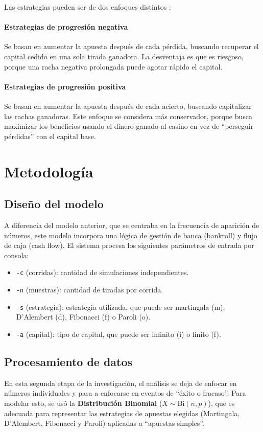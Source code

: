 \documentclass{article}
\begin{document}
Las estrategias pueden ser de dos enfoques distintos \cite{estrategias_progresion}:

\paragraph{Estrategias de progresión negativa} Se basan en aumentar la apuesta después de cada pérdida, buscando recuperar el capital cedido en una sola tirada ganadora. La desventaja es que es riesgoso, porque una racha negativa prolongada puede agotar rápido el capital.

\paragraph{Estrategias de progresión positiva} Se basan en aumentar la apuesta después de cada acierto, buscando capitalizar las rachas ganadoras. Este enfoque se considera más conservador, porque busca maximizar los beneficios usando el dinero ganado al casino en vez de “perseguir pérdidas” con el capital base.




\section{Metodología}
\label{sec:metodologia}

\subsection{Diseño del modelo}
A diferencia del modelo anterior, que se centraba en la frecuencia de aparición de números, este modelo incorpora una lógica de gestión de banca (bankroll) y flujo de caja (cash flow). El sistema procesa los siguientes parámetros de entrada por consola:

\begin{itemize}
  \item \texttt{-c} (corridas): cantidad de simulaciones independientes.
  \item \texttt{-n} (muestras): cantidad de tiradas por corrida.
  \item \texttt{-s} (estrategia): estrategia utilizada, que puede ser martingala (m), D’Alembert (d), Fibonacci (f) o Paroli (o).
  \item \texttt{-a} (capital): tipo de capital, que puede ser infinito (i) o finito (f).
\end{itemize}

\subsection{Procesamiento de datos}
En esta segunda etapa de la investigación, el análisis se deja de enfocar en números individuales y pasa a enfocarse en eventos de “éxito o fracaso”. Para modelar esto, se usó la \textbf{Distribución Binomial} ($X\sim \mathrm{Bi}(n,p)$), que es adecuada para representar las estrategias de apuestas elegidas (Martingala, D’Alembert, Fibonacci y Paroli) aplicadas a “apuestas simples”.
\end{document}
